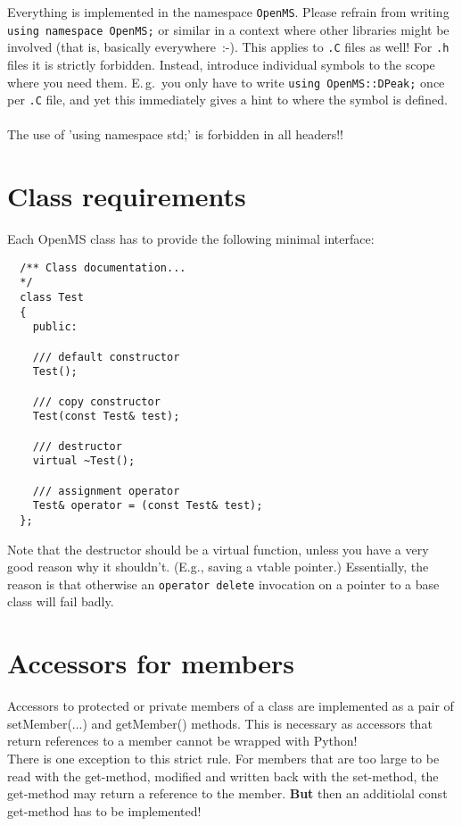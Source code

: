 \documentclass[a4]{article}
\begin{document}
Everything is implemented in the namespace \texttt{OpenMS}.  Please refrain
from writing \texttt{using namespace OpenMS;} or similar in a context where
other libraries might be involved (that is, basically everywhere~:-).  This
applies to \texttt{.C} files as well!  For \texttt{.h} files it is strictly
forbidden.  Instead, introduce individual symbols to the scope where you need
them.  E.\,g.\ you only have to write \texttt{using OpenMS::DPeak;} once per
\texttt{.C} file, and yet this immediately gives a hint to where the symbol is
defined.\\
\\
The use of 'using namespace std;' is forbidden in all headers!!


\section{Class requirements}

Each OpenMS class has to provide the following minimal interface:
\begin{verbatim}
  /** Class documentation... 
  */
  class Test
  {
    public:

    /// default constructor
    Test();

    /// copy constructor 
    Test(const Test& test);

    /// destructor 
    virtual ~Test();
 
    /// assignment operator
    Test& operator = (const Test& test);
  };
\end{verbatim}
Note that the destructor should be a virtual function, unless you have a very
good reason why it shouldn't.  (E.g., saving a vtable pointer.)  Essentially,
the reason is that otherwise an \texttt{operator delete} invocation on a
pointer to a base class will fail badly.

\section{Accessors for members}
Accessors to protected or private members of a class are implemented as a pair
of setMember(...) and getMember() methods.
This is necessary as accessors that return references to a member cannot be wrapped with Python!\\
There is one exception to this strict rule. For members that are too large to be
read with the get-method, modified and written back with the set-method, the
get-method may return a reference to the member. {\bf But} then an additiolal const
get-method has to be implemented! 
\end{document}

